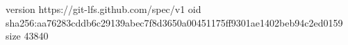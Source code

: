 version https://git-lfs.github.com/spec/v1
oid sha256:aa76283cddb6c29139abec7f8d3650a00451175ff9301ae1402beb94c2ed0159
size 43840
